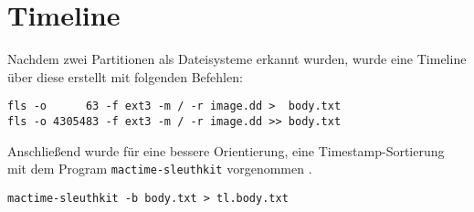 \section{Timeline}
Nachdem zwei Partitionen als Dateisysteme erkannt wurden, wurde eine Timeline über diese erstellt mit folgenden Befehlen:
\begin{verbatim}
fls -o      63 -f ext3 -m / -r image.dd >  body.txt
fls -o 4305483 -f ext3 -m / -r image.dd >> body.txt
\end{verbatim}
Anschließend wurde für eine bessere Orientierung, eine Timestamp-Sortierung mit dem Program \texttt{mactime-sleuthkit} vorgenommen .
\begin{verbatim}
mactime-sleuthkit -b body.txt > tl.body.txt
\end{verbatim}